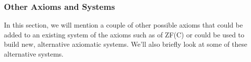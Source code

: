 











\subsubsection{Other Axioms and Systems}
In this section, we will mention a couple of other possible axioms that could be added to an existing system of the axioms such as of ZF(C) or could be used to build new, alternative axiomatic systems. We'll also briefly look at some of these alternative systems.

